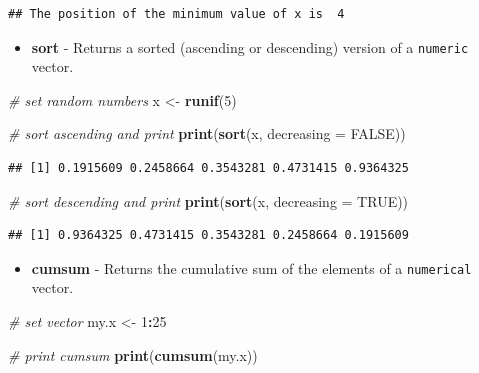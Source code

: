 \documentclass[11pt,]{book}
\newenvironment{Shaded}{\begin{snugshade}}{\end{snugshade}}
\newcommand{\KeywordTok}[1]{\textcolor[rgb]{0.27,0.27,0.27}{\textbf{#1}}}
\newcommand{\DataTypeTok}[1]{\textcolor[rgb]{0.27,0.27,0.27}{#1}}
\newcommand{\DecValTok}[1]{\textcolor[rgb]{0.06,0.06,0.06}{#1}}
\newcommand{\StringTok}[1]{\textcolor[rgb]{0.5,0.5,0.5}{#1}}
\newcommand{\CommentTok}[1]{\textcolor[rgb]{0.56,0.35,0.01}{\textit{#1}}}
\newcommand{\OtherTok}[1]{\textcolor[rgb]{0.56,0.35,0.01}{#1}}
\newcommand{\OperatorTok}[1]{\textcolor[rgb]{0.81,0.36,0.00}{\textbf{#1}}}
\newcommand{\NormalTok}[1]{#1}
\providecommand{\tightlist}{%
  \setlength{\itemsep}{0pt}\setlength{\parskip}{0pt}}
\begin{document}
\begin{verbatim}
## The position of the minimum value of x is  4
\end{verbatim}

\begin{itemize}
\tightlist
\item
  \textbf{sort} - Returns a sorted (ascending or descending) version of
  a \texttt{numeric} vector. 
\end{itemize}

\begin{Shaded}
\begin{Highlighting}[]
\CommentTok{# set random numbers}
\NormalTok{x <-}\StringTok{ }\KeywordTok{runif}\NormalTok{(}\DecValTok{5}\NormalTok{)}

\CommentTok{# sort ascending and print}
\KeywordTok{print}\NormalTok{(}\KeywordTok{sort}\NormalTok{(x, }\DataTypeTok{decreasing =} \OtherTok{FALSE}\NormalTok{))}
\end{Highlighting}
\end{Shaded}

\begin{verbatim}
## [1] 0.1915609 0.2458664 0.3543281 0.4731415 0.9364325
\end{verbatim}

\begin{Shaded}
\begin{Highlighting}[]
\CommentTok{# sort descending and print}
\KeywordTok{print}\NormalTok{(}\KeywordTok{sort}\NormalTok{(x, }\DataTypeTok{decreasing =} \OtherTok{TRUE}\NormalTok{))}
\end{Highlighting}
\end{Shaded}

\begin{verbatim}
## [1] 0.9364325 0.4731415 0.3543281 0.2458664 0.1915609
\end{verbatim}

\begin{itemize}
\tightlist
\item
  \textbf{cumsum} - Returns the cumulative sum of the elements of a
  \texttt{numerical} vector. 
\end{itemize}

\begin{Shaded}
\begin{Highlighting}[]
\CommentTok{# set vector}
\NormalTok{my.x <-}\StringTok{ }\DecValTok{1}\OperatorTok{:}\DecValTok{25}

\CommentTok{# print cumsum}
\KeywordTok{print}\NormalTok{(}\KeywordTok{cumsum}\NormalTok{(my.x))}
\end{Highlighting}
\end{Shaded}
\end{document}

